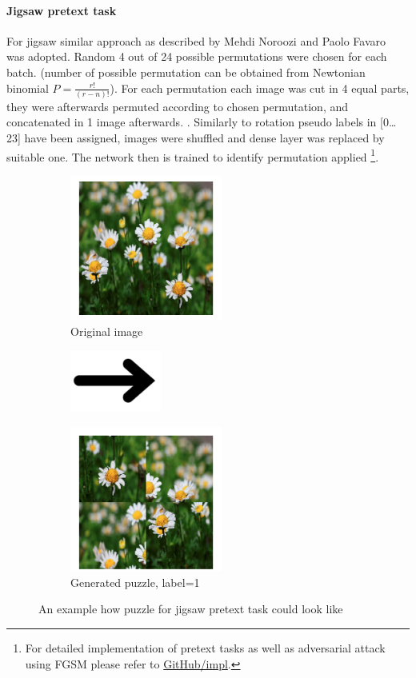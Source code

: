 



\paragraph{Jigsaw pretext task}
For jigsaw similar approach as described by Mehdi Noroozi and Paolo Favaro~\cite{DBLP:journals/corr/NorooziF16} was adopted.
Random 4 out of 24 possible permutations were chosen for each batch.
(number of possible permutation can be obtained from Newtonian binomial $P=\frac{r!}{(r-n)!}$).
For each permutation each image was cut in 4 equal parts, they were afterwards permuted according to chosen permutation,
and concatenated in 1 image afterwards.
.
Similarly to rotation pseudo labels in [0\ldots23] have been assigned, images were shuffled and dense layer was replaced by suitable one.
The network then is trained to identify permutation applied \footnote{
    For detailed implementation of pretext tasks as well as adversarial attack \\ using FGSM please refer to \href{https://github.com/Goofy-Goof/ISS/blob/33a2ad40b779ff230aae31c29d2edc2cf5d90406/impl}{GitHub/impl}.
}.
\\
\begin{figure}[h]
    \begin{subfigure}{0.33\textwidth}
        \caption{Original image}
        \includegraphics[width=5cm]{images/dandelion}
    \end{subfigure}
    \begin{subfigure}{0.2\textwidth}
        \includegraphics[width=3cm]{images/arrow}
    \end{subfigure}
    \begin{subfigure}{0.33\textwidth}
        \caption{Generated puzzle, label=1}
        \includegraphics[width=5cm]{images/puzzle}
    \end{subfigure}
    \caption{An example how puzzle for jigsaw pretext task could look like}
\end{figure}

